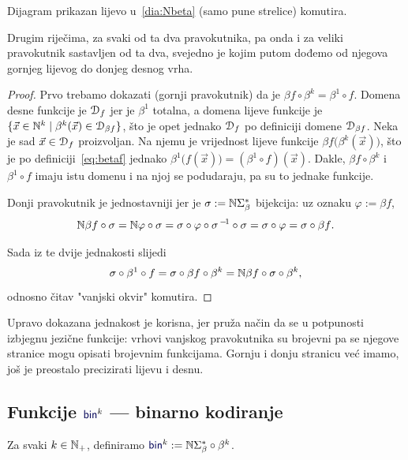 \begin{lema}[{name=[brojevni-jezični-brojevni dijagram komutira]}]\label{lm:pravkomut}
Dijagram prikazan lijevo u~\eqref{dia:Nbeta} (samo pune strelice) komutira.
\end{lema}
Drugim riječima, za svaki od ta dva pravokutnika, pa onda i za veliki pravokutnik sastavljen od ta dva, svejedno je kojim putom dođemo od njegova gornjeg lijevog do donjeg desnog vrha.
\begin{proof}
Prvo trebamo dokazati (gornji pravokutnik) da je $\beta f\circ\beta^k =\beta^1\circ f$. Domena desne funkcije je $\mathcal D_{f}$ jer je $\beta^1$ totalna, a domena lijeve funkcije je $\{\vec x\in{\mathbb N}^k\mid\beta^k(\vec x)\in\mathcal D_{\beta f}\}$, što je opet jednako $\mathcal D_{f}$ po definiciji domene $\mathcal D_{\beta f}$. Neka je sad $\vec x\in\mathcal D_{f}$ proizvoljan. Na njemu je vrijednost lijeve funkcije $\beta f\bigl(\beta^k(\vec x)\bigr)$, što je po definiciji~\eqref{eq:betaf} jednako $\beta^1\bigl(f(\vec x)\bigr)=(\beta^1\circ f)(\vec x)$. Dakle, $\beta f\circ\beta^k$ i $\beta^1\circ f$ imaju istu domenu i na njoj se podudaraju, pa su to jednake funkcije.

Donji pravokutnik je jednostavniji jer je $\sigma:={\mathbb N}\Sigma_\beta^*$ bijekcija: uz oznaku $\varphi:=\beta f$,
\begin{equation}
    {\mathbb N}\beta f\circ\sigma={\mathbb N}\varphi\circ\sigma=\sigma\circ\varphi\circ\sigma^{\,-\!1}\circ\sigma=\sigma\circ\varphi=\sigma\circ\beta f\text.
\end{equation}

Sada iz te dvije jednakosti slijedi
\begin{equation}\label{eq:pravkomut}
    \sigma\circ\beta^1\circ f=\sigma\circ\beta f\circ\beta^k={\mathbb N}\beta f\circ\sigma\circ\beta^k\text,
\end{equation}
odnosno čitav "\!vanjski okvir" komutira.
\end{proof}

Upravo dokazana jednakost je korisna, jer pruža način da se u potpunosti izbjegnu jezične funkcije: vrhovi vanjskog pravokutnika su brojevni pa se njegove stranice mogu opisati brojevnim funkcijama. Gornju i donju stranicu već imamo, još je preostalo precizirati lijevu i desnu.

\subsection{Funkcije \texorpdfstring{$\f{bin}^k$}{bin} --- binarno kodiranje}

\begin{definicija}[{name=[binarno kodiranje --- prateća funkcija binarne reprezentacije]}]\label{def:bink}
Za svaki $k\in{\mathbb N}_+$, definiramo $\f{bin}^k:=\N\Sigma_\beta^*\circ\beta^k$.
\end{definicija}

